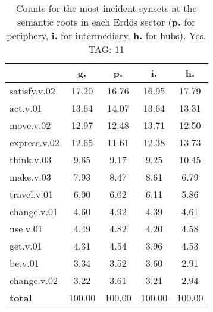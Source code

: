 \begin{table}[h!]
\begin{center}
\begin{tabular}{| l || c | c | c | c |}\hline
 & {\bf g.} & {\bf p.} & {\bf i.} & {\bf h.} \\\hline\hline
satisfy.v.02 & 17.20  & 16.76  & 16.95  & 17.79 \\\hline
act.v.01 & 13.64  & 14.07  & 13.64  & 13.31 \\\hline
move.v.02 & 12.97  & 12.48  & 13.71  & 12.50 \\\hline
express.v.02 & 12.65  & 11.61  & 12.38  & 13.73 \\\hline
think.v.03 & 9.65  & 9.17  & 9.25  & 10.45 \\\hline
make.v.03 & 7.93  & 8.47  & 8.61  & 6.79 \\\hline
travel.v.01 & 6.00  & 6.02  & 6.11  & 5.86 \\\hline
change.v.01 & 4.60  & 4.92  & 4.39  & 4.61 \\\hline
use.v.01 & 4.49  & 4.82  & 4.20  & 4.58 \\\hline
get.v.01 & 4.31  & 4.54  & 3.96  & 4.53 \\\hline
be.v.01 & 3.34  & 3.52  & 3.60  & 2.91 \\\hline
change.v.02 & 3.22  & 3.61  & 3.21  & 2.94 \\\hline\hline
{{\bf total}} & 100.00  & 100.00  & 100.00  & 100.00 \\\hline
\end{tabular}
\caption{Counts for the most incident synsets at the semantic roots in each Erd\"os sector ({\bf p.} for periphery, {\bf i.} for intermediary, {\bf h.} for hubs). Yes. TAG: 11}
\end{center}
\end{table}